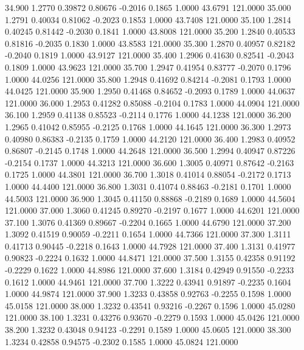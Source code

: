   34.900   1.2770   0.39872   0.80676  -0.2016   0.1865   1.0000  43.6791 121.0000
  35.000   1.2791   0.40034   0.81062  -0.2023   0.1853   1.0000  43.7408 121.0000
  35.100   1.2814   0.40245   0.81442  -0.2030   0.1841   1.0000  43.8008 121.0000
  35.200   1.2840   0.40533   0.81816  -0.2035   0.1830   1.0000  43.8583 121.0000
  35.300   1.2870   0.40957   0.82182  -0.2040   0.1819   1.0000  43.9127 121.0000
  35.400   1.2906   0.41630   0.82541  -0.2043   0.1809   1.0000  43.9623 121.0000
  35.700   1.2947   0.41954   0.83777  -0.2070   0.1796   1.0000  44.0256 121.0000
  35.800   1.2948   0.41692   0.84214  -0.2081   0.1793   1.0000  44.0425 121.0000
  35.900   1.2950   0.41468   0.84652  -0.2093   0.1789   1.0000  44.0637 121.0000
  36.000   1.2953   0.41282   0.85088  -0.2104   0.1783   1.0000  44.0904 121.0000
  36.100   1.2959   0.41138   0.85523  -0.2114   0.1776   1.0000  44.1238 121.0000
  36.200   1.2965   0.41042   0.85955  -0.2125   0.1768   1.0000  44.1645 121.0000
  36.300   1.2973   0.40980   0.86383  -0.2135   0.1759   1.0000  44.2120 121.0000
  36.400   1.2983   0.40952   0.86807  -0.2145   0.1748   1.0000  44.2648 121.0000
  36.500   1.2994   0.40947   0.87226  -0.2154   0.1737   1.0000  44.3213 121.0000
  36.600   1.3005   0.40971   0.87642  -0.2163   0.1725   1.0000  44.3801 121.0000
  36.700   1.3018   0.41014   0.88054  -0.2172   0.1713   1.0000  44.4400 121.0000
  36.800   1.3031   0.41074   0.88463  -0.2181   0.1701   1.0000  44.5003 121.0000
  36.900   1.3045   0.41150   0.88868  -0.2189   0.1689   1.0000  44.5604 121.0000
  37.000   1.3060   0.41245   0.89270  -0.2197   0.1677   1.0000  44.6201 121.0000
  37.100   1.3076   0.41369   0.89667  -0.2204   0.1665   1.0000  44.6790 121.0000
  37.200   1.3092   0.41519   0.90059  -0.2211   0.1654   1.0000  44.7366 121.0000
  37.300   1.3111   0.41713   0.90445  -0.2218   0.1643   1.0000  44.7928 121.0000
  37.400   1.3131   0.41977   0.90823  -0.2224   0.1632   1.0000  44.8471 121.0000
  37.500   1.3155   0.42358   0.91192  -0.2229   0.1622   1.0000  44.8986 121.0000
  37.600   1.3184   0.42949   0.91550  -0.2233   0.1612   1.0000  44.9461 121.0000
  37.700   1.3222   0.43941   0.91897  -0.2235   0.1604   1.0000  44.9874 121.0000
  37.900   1.3233   0.43858   0.92763  -0.2255   0.1598   1.0000  45.0158 121.0000
  38.000   1.3232   0.43541   0.93216  -0.2267   0.1596   1.0000  45.0280 121.0000
  38.100   1.3231   0.43276   0.93670  -0.2279   0.1593   1.0000  45.0426 121.0000
  38.200   1.3232   0.43048   0.94123  -0.2291   0.1589   1.0000  45.0605 121.0000
  38.300   1.3234   0.42858   0.94575  -0.2302   0.1585   1.0000  45.0824 121.0000
